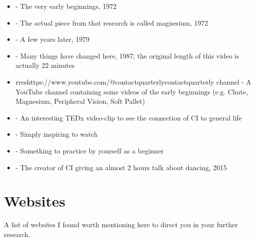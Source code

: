 \begin{itemize}
    \setlength\itemsep{0em}
    \item {} - The very early beginnings, 1972
    \item {} - The actual piece from that research is called magnesium, 1972
    \item {} - A few years later, 1979
    \item {} - Many things have changed here, 1987; the original length of this video is actually 22 minutes
    \item rres{https://www.youtube.com/@contactquarterly}{contactquarterly channel} - A YouTube channel containing some videos of the early beginnings (e.g. Chute, Magnesium, Peripheral Vision, Soft Pallet)
    \item {} - An interesting TEDx video-clip to see the connection of CI to general life
    \item {} - Simply inspiring to watch
    \item {} - Something to practice by yourself as a beginner
    \item {} - The creator of CI giving an almost 2 hours talk about dancing, 2015
\end{itemize}

\section{Websites}\label{sec:websites}

A list of websites I found worth mentioning here to direct you in your further research.

